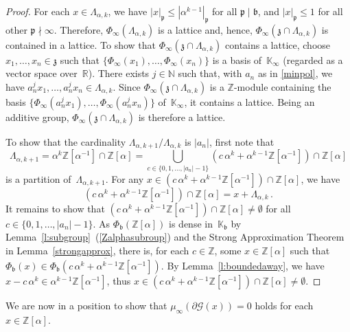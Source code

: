 \documentclass[12pt]{amsart}
\theoremstyle{definition}
\theoremstyle{remark}
\numberwithin{equation}{section}
\begin{document}
\begin{proof}
For each $x \in \Lambda_{\alpha,k}$, we have $|x|_\mathfrak{p} \le |\alpha^{k-1}|_\mathfrak{p}$ for all $\mathfrak{p} \mid \mathfrak{b}$, and $|x|_\mathfrak{p} \le 1$ for all other $\mathfrak{p} \nmid \infty$.
Therefore, $\Phi_\infty(\Lambda_{\alpha,k})$ is a lattice and, hence, $\Phi_\infty(\mathfrak{z} \cap \Lambda_{\alpha,k})$ is contained in a lattice.
To show that $\Phi_\infty(\mathfrak{z} \cap \Lambda_{\alpha,k})$ contains a lattice, choose $x_1, \ldots, x_n \in \mathfrak{z}$ such that $\{\Phi_\infty(x_1), \ldots, \Phi_\infty(x_n)\}$ is a basis of~$\mathbb{K}_\infty$ (regarded as a vector space over~$\mathbb{R}$).
There exists $j \in \mathbb{N}$ such that, with $a_n$ as in \eqref{minpol}, 
we have  $a_n^j x_1, \ldots, a_n^j x_n \in \Lambda_{\alpha,k}$.
Since $\Phi_\infty(\mathfrak{z} \cap \Lambda_{\alpha,k})$ is a $\mathbb{Z}$-module containing the basis $\{\Phi_\infty(a_n^j x_1), \ldots, \Phi_\infty(a_n^j x_n)\}$ of~$\mathbb{K}_\infty$, it contains a lattice. Being an additive group, $\Phi_\infty(\mathfrak{z} \cap \Lambda_{\alpha,k})$ is therefore a lattice.

To show that the cardinality $\Lambda_{\alpha,k+1} / \Lambda_{\alpha,k}$ is $|a_n|$, first note that
\[
\Lambda_{\alpha,k+1} = \alpha^k \mathbb{Z}[\alpha^{-1}] \cap \mathbb{Z}[\alpha] = \bigcup_{c\in\{0,1,\ldots,|a_n|-1\}} (c\, \alpha^k + \alpha^{k-1} \mathbb{Z}[\alpha^{-1}]) \cap \mathbb{Z}[\alpha]
\]
is a partition of~$\Lambda_{\alpha,k+1}$.
For any $x \in (c\, \alpha^k + \alpha^{k-1} \mathbb{Z}[\alpha^{-1}]) \cap \mathbb{Z}[\alpha]$, we have 
\[
(c\, \alpha^k + \alpha^{k-1} \mathbb{Z}[\alpha^{-1}]) \cap \mathbb{Z}[\alpha] = x  + \Lambda_{\alpha,k}\,.
\]
It remains to show that $(c\, \alpha^k + \alpha^{k-1} \mathbb{Z}[\alpha^{-1}]) \cap \mathbb{Z}[\alpha] \neq \emptyset$ for all $c\in\{0,1,\ldots,|a_n|-1\}$.
As $\Phi_\mathfrak{b}(\mathbb{Z}[\alpha])$ is dense in~$\mathbb{K}_\mathfrak{b}$ by Lemma~\ref{l:subgroup}~(\ref{Zalphasubroup}) and the Strong Approximation Theorem in Lemma~\ref{strongapprox}, there is, for each $c \in \mathbb{Z}$, some $x \in \mathbb{Z}[\alpha]$ such that $\Phi_\mathfrak{b}(x) \in \overline{\Phi_\mathfrak{b}(c\, \alpha^k+\alpha^{k-1} \mathbb{Z}[\alpha^{-1}])}$.
By Lemma~\ref{l:boundedaway}, we have $x - c\, \alpha^k \in \alpha^{k-1} \mathbb{Z}[\alpha^{-1}]$, thus $x \in (c\, \alpha^k + \alpha^{k-1} \mathbb{Z}[\alpha^{-1}]) \cap \mathbb{Z}[\alpha] \neq \emptyset$.
\end{proof}

We are now in a position to show that $\mu_\infty(\partial\mathcal{G}(x)) = 0$ holds
for each $x \in \mathbb{Z}[\alpha]$. 
\end{document}
